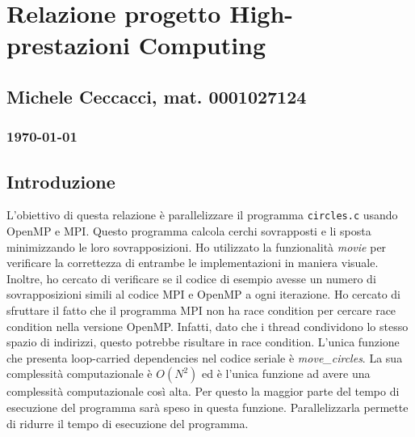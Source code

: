\documentclass[a4paper,11pt, twoside]{report}
\begin{document}
\section*{Relazione progetto High-prestazioni Computing}
\subsection*{Michele Ceccacci, mat. 0001027124}
\subsubsection*{\today}

\subsection*{Introduzione}
L'obiettivo di questa relazione è parallelizzare il programma \texttt{circles.c} usando OpenMP e MPI.
Questo programma calcola cerchi sovrapposti e li sposta minimizzando le loro sovrapposizioni.
Ho utilizzato la funzionalità \textit{movie} per verificare la correttezza di entrambe le implementazioni in maniera visuale. 
Inoltre, ho cercato di verificare se il codice di esempio avesse un numero di sovrapposizioni simili al codice MPI e OpenMP a ogni iterazione.
Ho cercato di sfruttare il fatto che il programma MPI non ha race condition per cercare race condition nella versione OpenMP. Infatti, dato che i thread condividono lo stesso spazio di indirizzi, questo potrebbe risultare in race condition. L'unica funzione che presenta loop-carried dependencies nel codice seriale è \textit{move\_circles}. La sua complessità computazionale è $O(N^2)$ ed è l'unica funzione ad avere una complessità computazionale così alta.
Per questo la maggior parte del tempo di esecuzione del programma sarà speso in questa funzione.
Parallelizzarla permette di ridurre il tempo di esecuzione del programma.
\end{document}
